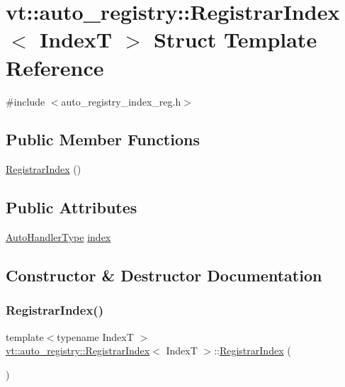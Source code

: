 \hypertarget{structvt_1_1auto__registry_1_1_registrar_index}{}\section{vt\+:\+:auto\+\_\+registry\+:\+:Registrar\+Index$<$ IndexT $>$ Struct Template Reference}
\label{structvt_1_1auto__registry_1_1_registrar_index}


{\ttfamily \#include $<$auto\+\_\+registry\+\_\+index\+\_\+reg.\+h$>$}

\subsection*{Public Member Functions}
\begin{DoxyCompactItemize}
\item 
\hyperlink{structvt_1_1auto__registry_1_1_registrar_index_ad939912c86625e310a062f90573d7f44}{Registrar\+Index} ()
\end{DoxyCompactItemize}
\subsection*{Public Attributes}
\begin{DoxyCompactItemize}
\item 
\hyperlink{namespacevt_1_1auto__registry_ae295e18699146815bb7d7674594d95d7}{Auto\+Handler\+Type} \hyperlink{structvt_1_1auto__registry_1_1_registrar_index_a1ad2ff12ac96ae55412937063a864703}{index}
\end{DoxyCompactItemize}


\subsection{Constructor \& Destructor Documentation}
\mbox{\label{structvt_1_1auto__registry_1_1_registrar_index_ad939912c86625e310a062f90573d7f44}} 
\subsubsection{\texorpdfstring{Registrar\+Index()}{RegistrarIndex()}}
{\footnotesize\ttfamily template$<$typename IndexT $>$ \\
\hyperlink{structvt_1_1auto__registry_1_1_registrar_index}{vt\+::auto\+\_\+registry\+::\+Registrar\+Index}$<$ IndexT $>$\+::\hyperlink{structvt_1_1auto__registry_1_1_registrar_index}{Registrar\+Index} (\begin{DoxyParamCaption}{ }\end{DoxyParamCaption})}



